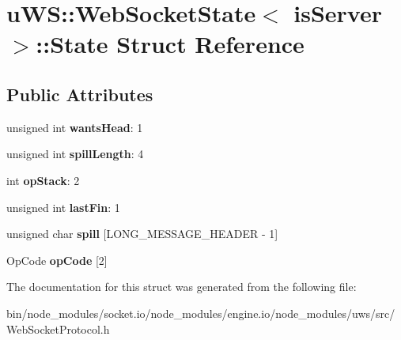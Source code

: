 \hypertarget{structu_w_s_1_1_web_socket_state_1_1_state}{}\section{u\+WS\+:\+:Web\+Socket\+State$<$ is\+Server $>$\+:\+:State Struct Reference}
\label{structu_w_s_1_1_web_socket_state_1_1_state}
\subsection*{Public Attributes}
\begin{DoxyCompactItemize}
\item 
\mbox{\label{structu_w_s_1_1_web_socket_state_1_1_state_a100da5db0df35425715b664dbcfd30b9}} 
unsigned int {\bfseries wants\+Head}\+: 1
\item 
\mbox{\label{structu_w_s_1_1_web_socket_state_1_1_state_a892cd0e66673ce5e290c9c33d9dc0e74}} 
unsigned int {\bfseries spill\+Length}\+: 4
\item 
\mbox{\label{structu_w_s_1_1_web_socket_state_1_1_state_ac0154f8e0a01185ac409b6cc6851f067}} 
int {\bfseries op\+Stack}\+: 2
\item 
\mbox{\label{structu_w_s_1_1_web_socket_state_1_1_state_ab596d0be8018529966534661a524070c}} 
unsigned int {\bfseries last\+Fin}\+: 1
\item 
\mbox{\label{structu_w_s_1_1_web_socket_state_1_1_state_a4d9324a40734c78779764838c8ae908e}} 
unsigned char {\bfseries spill} \mbox{[}L\+O\+N\+G\+\_\+\+M\+E\+S\+S\+A\+G\+E\+\_\+\+H\+E\+A\+D\+ER -\/ 1\mbox{]}
\item 
\mbox{\label{structu_w_s_1_1_web_socket_state_1_1_state_a4030c5c3d32969e606ed767a5392c76e}} 
Op\+Code {\bfseries op\+Code} \mbox{[}2\mbox{]}
\end{DoxyCompactItemize}


The documentation for this struct was generated from the following file\+:\begin{DoxyCompactItemize}
\item 
bin/node\+\_\+modules/socket.\+io/node\+\_\+modules/engine.\+io/node\+\_\+modules/uws/src/Web\+Socket\+Protocol.\+h\end{DoxyCompactItemize}
